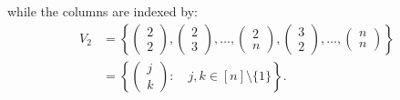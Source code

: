 while the columns are indexed by:
\begin{align*}
    V_2 &= \left\{\begin{pmatrix} 2 \\ 2 \end{pmatrix}, \begin{pmatrix} 2 \\ 3 \end{pmatrix}, \dots, \begin{pmatrix} 2 \\ n \end{pmatrix}, \begin{pmatrix} 3 \\ 2 \end{pmatrix}, \dots, \begin{pmatrix} n \\ n \end{pmatrix}\right\} \\
    &= \left\{\begin{pmatrix}j \\k\end{pmatrix}:\quad j,k\in[n]\setminus\{1\}\right\}.
\end{align*}

